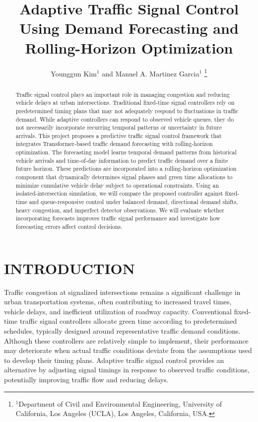\documentclass[letterpaper,12pt,conference]{ieeeconf}
\title{\LARGE \bf
Adaptive Traffic Signal Control Using
Demand Forecasting and Rolling-Horizon Optimization
}
\author{
Younggun Kim$^{1}$ and Manuel A. Martinez Garcia$^{1}$%
\thanks{$^{1}$Department of Civil and Environmental Engineering,
University of California, Los Angeles (UCLA),
Los Angeles, California, USA.}%
}
\begin{document}
\maketitle
\thispagestyle{empty}
\pagestyle{empty}

\begin{abstract}

Traffic signal control plays an important role in managing
congestion and reducing vehicle delays at urban intersections.
Traditional fixed-time signal controllers rely on predetermined
timing plans that may not adequately respond to fluctuations
in traffic demand. While adaptive controllers can respond to
observed vehicle queues, they do not necessarily incorporate
recurring temporal patterns or uncertainty in future arrivals.
This project proposes a predictive traffic signal control framework that integrates Transformer-based traffic demand forecasting with rolling-horizon optimization. The forecasting model learns temporal demand patterns from historical vehicle arrivals and time-of-day information to predict traffic demand over a finite future horizon. These predictions are incorporated into a rolling-horizon optimization component that dynamically determines signal phases and green time allocations to minimize cumulative vehicle delay subject to operational constraints.
Using an isolated-intersection simulation,
we will compare the proposed controller against fixed-time
and queue-responsive control under balanced demand,
directional demand shifts, heavy congestion, and imperfect
detector observations. We will evaluate whether incorporating
forecasts improves traffic signal performance and
investigate how forecasting errors affect control decisions.

\end{abstract}

\section{INTRODUCTION}

Traffic congestion at signalized intersections remains a
significant challenge in urban transportation systems, often
contributing to increased travel times, vehicle delays, and
inefficient utilization of roadway capacity. Conventional
fixed-time traffic signal controllers allocate green time
according to predetermined schedules, typically designed
around representative traffic demand conditions. Although
these controllers are relatively simple to implement,
their performance may deteriorate when actual traffic
conditions deviate from the assumptions used to develop
their timing plans. Adaptive traffic signal control provides
an alternative by adjusting signal timings in response to
observed traffic conditions, potentially improving traffic
flow and reducing delays.
\end{document}
